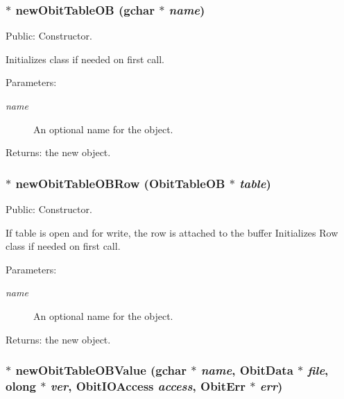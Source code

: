 \subsubsection{$\ast$ new\-Obit\-Table\-OB (gchar $\ast$ {\em name})}\label{ObitTableOB_8c_a16}


Public: Constructor. 

Initializes class if needed on first call. \begin{Desc}
\item[Parameters:]
\begin{description}
\item[{\em name}]An optional name for the object. \end{description}
\end{Desc}
\begin{Desc}
\item[Returns:]the new object. \end{Desc}
\subsubsection{$\ast$ new\-Obit\-Table\-OBRow ({\bf Obit\-Table\-OB} $\ast$ {\em table})}\label{ObitTableOB_8c_a14}


Public: Constructor. 

If table is open and for write, the row is attached to the buffer Initializes Row class if needed on first call. \begin{Desc}
\item[Parameters:]
\begin{description}
\item[{\em name}]An optional name for the object. \end{description}
\end{Desc}
\begin{Desc}
\item[Returns:]the new object. \end{Desc}
\subsubsection{$\ast$ new\-Obit\-Table\-OBValue (gchar $\ast$ {\em name}, {\bf Obit\-Data} $\ast$ {\em file}, {\bf olong} $\ast$ {\em ver}, Obit\-IOAccess {\em access}, {\bf Obit\-Err} $\ast$ {\em err})}\label{ObitTableOB_8c_a18}


